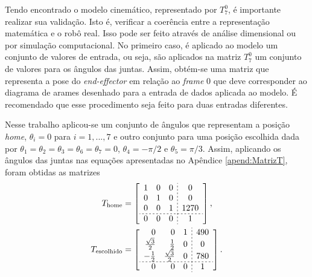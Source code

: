 


Tendo encontrado o modelo cinemático, representado por $T_7^0$, é importante realizar sua validação. Isto é, verificar a coerência entre a representação matemática e o robô real. Isso pode ser feito através de análise dimensional ou por simulação computacional. No primeiro caso, é aplicado ao modelo um conjunto de valores de entrada, ou seja, são aplicados na matriz $T_7^0$ um conjunto de valores para os ângulos das juntas. Assim, obtém-se uma matriz que representa a pose do \textit{end-effector} em relação ao \textit{frame} 0 que deve corresponder ao diagrama de arames desenhado para a entrada de dados aplicada ao modelo. É recomendado que esse procedimento seja feito para duas entradas diferentes.

Nesse trabalho aplicou-se um conjunto de ângulos que representam a posição \textit{home}, $\theta_i=0$ para $i= 1, ... , 7$ e outro conjunto para uma posição escolhida dada por $\theta_1=\theta_2=\theta_3=\theta_6=\theta_7=0$, $\theta_4 = -\pi/2$ e $\theta_5 = \pi/3$. Assim, aplicando os ângulos das juntas nas equações apresentadas no Apêndice \ref{apend:MatrizT}, foram obtidas as matrizes
\begin{align}
T_\mathrm{home}
    &=
    \left[ 
    \begin{array}{rrr;{2pt/2pt}c}
        1 & 0 &  0 & 0 \\
        0 & 1 & 0 & 0 \\
        0 & 0 & 1 & 1270 \\
        \hdashline[2pt/2pt]
        0 & 0 & 0 & 1
    \end{array}
    \right],
    \label{eq:Thome} \\
T_\mathrm{escolhido}
    &=
    \left[ 
    \begin{array}{rrr;{2pt/2pt}c}
        0 & 0 & 1 & 490 \\
        \frac{\sqrt{3}}{2} & \frac{1}{2} &  0 & 0 \\
        -\frac{1}{2} & \frac{\sqrt{3}}{2} & 0 & 780 \\
        \hdashline[2pt/2pt]
        0 & 0 & 0 & 1
    \end{array}
    \right].
    \label{eq:Tescolhido}
\end{align}

